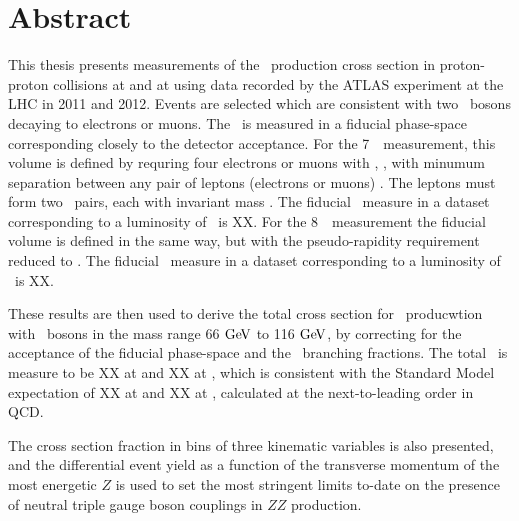 \chapter*{Abstract}
This thesis presents measurements of the \ZZ\ production cross section in proton-proton collisions
at  and at  using data recorded by the ATLAS experiment 
at the LHC in 2011 and 2012.  
Events are selected which are consistent with two \Z\ bosons decaying to
electrons or muons. The \cx\ is measured in a fiducial phase-space corresponding
closely to the detector acceptance. For the 7~\tev\ measurement, this volume is
defined by requring four electrons or muons with , ,
with minumum separation between any pair of leptons (electrons or muons) . The leptons
must form two \ossf\ pairs, each with invariant mass \sstooos. The fiducial \cx\
measure in a dataset corresponding to a luminosity of
\LumiPassGRLTwentyEleven\ifb\ is XX. For the 8~\tev\ measurement the fiducial
volume is defined in the same way, but with the pseudo-rapidity requirement
reduced to \modetalt{2.7}. The fiducial \cx\
measure in a dataset corresponding to a luminosity of
\LumiPassGRLTwentyTwelve\ifb\ is XX.

These results are then used to derive the total cross section for \ZZ\
producwtion with \Z\ bosons in the mass range 66$\GeV$ to 116$\GeV$, by
correcting for the acceptance of the fiducial phase-space and the \Zll\
branching fractions. The total \cx\ is measure to be XX at  and XX at
\sqrtseq{8}, which is consistent with the Standard Model
expectation of XX at \sqrtseq{7} and XX at
\sqrtseq{8}, calculated at the next-to-leading order in QCD.

The cross section fraction in bins of three kinematic variables is also presented, and 
the differential event yield as a function of the transverse momentum of the most energetic $Z$ 
is used to set the most stringent limits to-date on the presence of 
neutral triple gauge boson couplings in $ZZ$ production.
